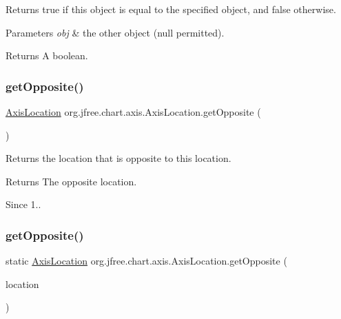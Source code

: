 Returns {\ttfamily true} if this object is equal to the specified object, and {\ttfamily false} otherwise.


\begin{DoxyParams}{Parameters}
{\em obj} & the other object ({\ttfamily null} permitted).\\
\hline
\end{DoxyParams}
\begin{DoxyReturn}{Returns}
A boolean. 
\end{DoxyReturn}
\mbox{\label{classorg_1_1jfree_1_1chart_1_1axis_1_1_axis_location_a34224152494bee323f19223c95c98430}} 
\subsubsection{\texorpdfstring{get\+Opposite()}{getOpposite()}\hspace{0.1cm}{\footnotesize\ttfamily [1/2]}}
{\footnotesize\ttfamily \mbox{\hyperlink{classorg_1_1jfree_1_1chart_1_1axis_1_1_axis_location}{Axis\+Location}} org.\+jfree.\+chart.\+axis.\+Axis\+Location.\+get\+Opposite (\begin{DoxyParamCaption}{ }\end{DoxyParamCaption})}

Returns the location that is opposite to this location.

\begin{DoxyReturn}{Returns}
The opposite location.
\end{DoxyReturn}
\begin{DoxySince}{Since}
1.. 
\end{DoxySince}
\mbox{\label{classorg_1_1jfree_1_1chart_1_1axis_1_1_axis_location_a44a0442ba04676a3bf899f804cae0600}} 
\subsubsection{\texorpdfstring{get\+Opposite()}{getOpposite()}\hspace{0.1cm}{\footnotesize\ttfamily [2/2]}}
{\footnotesize\ttfamily static \mbox{\hyperlink{classorg_1_1jfree_1_1chart_1_1axis_1_1_axis_location}{Axis\+Location}} org.\+jfree.\+chart.\+axis.\+Axis\+Location.\+get\+Opposite (\begin{DoxyParamCaption}\item[{\mbox{\hyperlink{classorg_1_1jfree_1_1chart_1_1axis_1_1_axis_location}{Axis\+Location}}}]{location }\end{DoxyParamCaption})\hspace{0.3cm}{\ttfamily [static]}}

